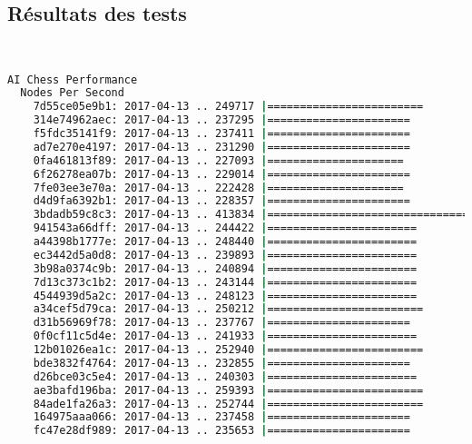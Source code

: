 \documentclass[french]{article}
\begin{document}
\subsection{Résultats des tests}
\begin{lstlisting}[language=bash,caption={TSCP 1.81}]


AI Chess Performance
  Nodes Per Second
    7d55ce05e9b1: 2017-04-13 .. 249717 |========================
    314e74962aec: 2017-04-13 .. 237295 |======================
    f5fdc35141f9: 2017-04-13 .. 237411 |======================
    ad7e270e4197: 2017-04-13 .. 231290 |======================
    0fa461813f89: 2017-04-13 .. 227093 |=====================
    6f26278ea07b: 2017-04-13 .. 229014 |======================
    7fe03ee3e70a: 2017-04-13 .. 222428 |=====================
    d4d9fa6392b1: 2017-04-13 .. 228357 |======================
    3bdadb59c8c3: 2017-04-13 .. 413834 |=======================================
    941543a66dff: 2017-04-13 .. 244422 |=======================
    a44398b1777e: 2017-04-13 .. 248440 |=======================
    ec3442d5a0d8: 2017-04-13 .. 239893 |=======================
    3b98a0374c9b: 2017-04-13 .. 240894 |=======================
    7d13c373c1b2: 2017-04-13 .. 243144 |=======================
    4544939d5a2c: 2017-04-13 .. 248123 |=======================
    a34cef5d79ca: 2017-04-13 .. 250212 |========================
    d31b56969f78: 2017-04-13 .. 237767 |======================
    0f0cf11c5d4e: 2017-04-13 .. 241933 |=======================
    12b01026ea1c: 2017-04-13 .. 252940 |========================
    bde3832f4764: 2017-04-13 .. 232855 |======================
    d26bce03c5e4: 2017-04-13 .. 240303 |=======================
    ae3bafd196ba: 2017-04-13 .. 259393 |========================
    84ade1fa26a3: 2017-04-13 .. 252744 |========================
    164975aaa066: 2017-04-13 .. 237458 |======================
    fc47e28df989: 2017-04-13 .. 235653 |======================

\end{lstlisting}
\newpage
\end{document}
